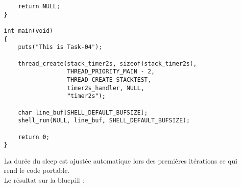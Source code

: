 \begin{lstlisting}
    return NULL;
}

int main(void)
{
    puts("This is Task-04");

    thread_create(stack_timer2s, sizeof(stack_timer2s),
                  THREAD_PRIORITY_MAIN - 2,
                  THREAD_CREATE_STACKTEST,
                  timer2s_handler, NULL,
                  "timer2s");
 
    char line_buf[SHELL_DEFAULT_BUFSIZE];
    shell_run(NULL, line_buf, SHELL_DEFAULT_BUFSIZE);

    return 0;
}
\end{lstlisting}

La durée du sleep est ajustée automatique lors des premières itérations
ce qui rend le code portable.\\

Le résultat sur la bluepill :
